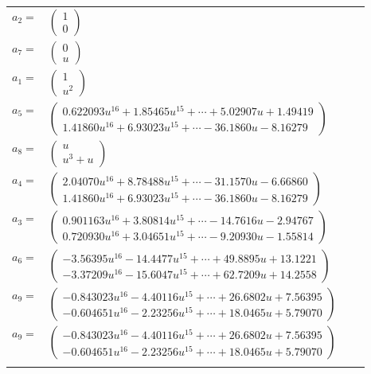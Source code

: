 \documentclass[1p]{elsarticle_modified}
\theoremstyle{definition}
\begin{document}
\begin{tabular}{m{7pt} m{180pt} m{7pt} m{180pt} }
\flushright $a_{2}=$&$\begin{pmatrix}1\\0\end{pmatrix}$ \\
\flushright $a_{7}=$&$\begin{pmatrix}0\\u\end{pmatrix}$ \\
\flushright $a_{1}=$&$\begin{pmatrix}1\\u^2\end{pmatrix}$ \\
\flushright $a_{5}=$&$\begin{pmatrix}0.622093 u^{16}+1.85465 u^{15}+\cdots+5.02907 u+1.49419\\1.41860 u^{16}+6.93023 u^{15}+\cdots-36.1860 u-8.16279\end{pmatrix}$ \\
\flushright $a_{8}=$&$\begin{pmatrix}u\\u^3+u\end{pmatrix}$ \\
\flushright $a_{4}=$&$\begin{pmatrix}2.04070 u^{16}+8.78488 u^{15}+\cdots-31.1570 u-6.66860\\1.41860 u^{16}+6.93023 u^{15}+\cdots-36.1860 u-8.16279\end{pmatrix}$ \\
\flushright $a_{3}=$&$\begin{pmatrix}0.901163 u^{16}+3.80814 u^{15}+\cdots-14.7616 u-2.94767\\0.720930 u^{16}+3.04651 u^{15}+\cdots-9.20930 u-1.55814\end{pmatrix}$ \\
\flushright $a_{6}=$&$\begin{pmatrix}-3.56395 u^{16}-14.4477 u^{15}+\cdots+49.8895 u+13.1221\\-3.37209 u^{16}-15.6047 u^{15}+\cdots+62.7209 u+14.2558\end{pmatrix}$ \\
\flushright $a_{9}=$&$\begin{pmatrix}-0.843023 u^{16}-4.40116 u^{15}+\cdots+26.6802 u+7.56395\\-0.604651 u^{16}-2.23256 u^{15}+\cdots+18.0465 u+5.79070\end{pmatrix}$\\ \flushright $a_{9}=$&$\begin{pmatrix}-0.843023 u^{16}-4.40116 u^{15}+\cdots+26.6802 u+7.56395\\-0.604651 u^{16}-2.23256 u^{15}+\cdots+18.0465 u+5.79070\end{pmatrix}$\\&\end{tabular}
\end{document}
